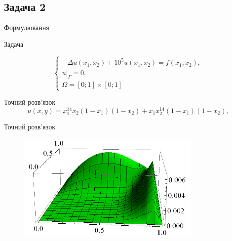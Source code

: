
\subsection{Задача 2}
\frame{\subsectionpage}
\begin{frame}{Формулювання}

		Задача

		\begin{equation}\label{eq:problem2}
		\begin{cases}
			- \Delta u(x_1,x_2) + 10^5 u(x_1, x_2) = f(x_1,x_2), \\
			u|_\Gamma = 0 ,\\
			\Omega = \left[0;1\right] \times \left[0;1\right]
		\end{cases}
		\end{equation}

		Точний розв'язок
		\begin{equation}
			u(x,y) = x_1^{14}x_2(1-x_1)(1-x_2)+x_1 x_2^{14}(1-x_1)(1-x_2),
		\end{equation}

\end{frame}

\begin{frame}{Точний розв'язок}
		\begin{figure}[H]
			\centering
		    \includegraphics[width=0.8\textwidth]{problem2/ExactSolution}
		    \label{plot:problem1_exact}
		\end{figure}
\end{frame}

